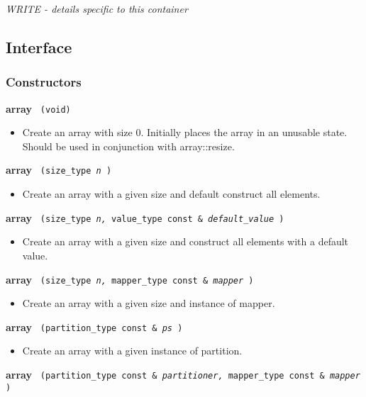 \textit{WRITE - details specific to this container}

\subsection{Interface} \label{sec-ary-cont-inter}

\subsubsection{Constructors}

\noindent
\textbf{array}%
\texttt{%
(void)
}

\begin{itemize}
\item
Create an array with size 0. Initially places the array in an unusable state. Should be used in conjunction with array::resize.
\end{itemize}
 
\noindent
\textbf{array}%
\texttt{%
(size\_type 
\textit{n}%
) 
}

\begin{itemize}
\item
Create an array with a given size and default construct all elements.
\end{itemize}
 
\noindent
\textbf{array}%
\texttt{%
(size\_type 
\textit{n,}%
value\_type const \& 
\textit{default\_value}%
) 
}

\begin{itemize}
\item
Create an array with a given size and construct all elements with a default value. 
\end{itemize}
 
\noindent
\textbf{array}%
\texttt{%
(size\_type 
\textit{n,}%
mapper\_type const \& 
\textit{mapper}%
)
}

\begin{itemize}
\item
Create an array with a given size and instance of mapper. 
\end{itemize}
 
\noindent
\textbf{array}%
\texttt{%
(partition\_type const \&
\textit{ps}%
)
}

\begin{itemize}
\item
Create an array with a given instance of partition. 
\end{itemize}
 
\noindent
\textbf{array}%
\texttt{%
(partition\_type const \&
\textit{partitioner,}%
mapper\_type const \&
\textit{mapper}%
)
}


